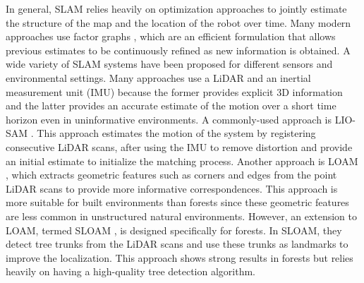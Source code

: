 In general, SLAM relies heavily on optimization approaches to jointly estimate the structure of the map and the location of the robot over time. Many modern approaches use factor graphs \cite{Dellaert2017FactorPerception}, which are an efficient formulation that allows previous estimates to be continuously refined as new information is obtained. A wide variety of SLAM systems have been proposed for different sensors and environmental settings. Many approaches use a LiDAR and an inertial measurement unit (IMU) because the former provides explicit 3D information and the latter provides an accurate estimate of the motion over a short time horizon even in uninformative environments. A commonly-used approach is LIO-SAM \cite{Shan2020LIO-SAM:Mapping}. This approach estimates the motion of the system by registering consecutive LiDAR scans, after using the IMU to remove distortion and provide an initial estimate to initialize the matching process. Another approach is LOAM \cite{Zhang2017}, which extracts geometric features such as corners and edges from the point LiDAR scans to provide more informative correspondences. This approach is more suitable for built environments than forests since these geometric features are less common in unstructured natural environments. However, an extension to LOAM, termed SLOAM \cite{Chen2020SLOAM:Inventory}, is designed specifically for forests. In SLOAM, they detect tree trunks from the LiDAR scans and use these trunks as landmarks to improve the localization. This approach shows strong results in forests but relies heavily on having a high-quality tree detection algorithm.


